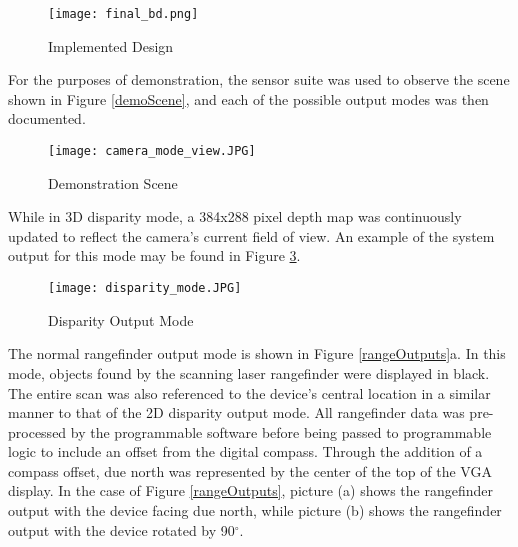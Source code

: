 \begin{figure}[H] 
	\centerline{
	\texttt{[image: final\_bd.png]}
	}
	\caption{Implemented Design}
	\label{finalBD}
\end{figure}
\par
For the purposes of demonstration, the sensor suite was used to observe the scene shown in Figure \ref{demoScene}, and each of the possible output modes was then documented.
\par
\begin{figure}[H]  
 	\centerline{
	\texttt{[image: camera\_mode\_view.JPG]}
	}
	\caption{Demonstration Scene}
	\label{camOutMode}
\end{figure}  
\par
While in 3D disparity mode, a 384x288 pixel depth map was continuously updated to reflect the camera's current field of view. An example of the system output for this mode may be found in Figure \ref{disparityOutputs}. 
\begin{figure}[H] 
              \centerline{\texttt{[image: disparity\_mode.JPG]}}
\caption{Disparity Output Mode}
\label{disparityOutputs}
\end{figure}

The normal rangefinder output mode is shown in Figure \ref{rangeOutputs}a. In this mode, objects found by the scanning laser rangefinder were displayed in black. The entire scan was also referenced to the device's central location in a similar manner to that of the 2D disparity output mode. All rangefinder data was pre-processed by the programmable software before being passed to programmable logic to include an offset from the digital compass.  Through the addition of a compass offset, due north was represented by the center of the top of the VGA display. In the case of Figure \ref{rangeOutputs}, picture (a) shows the rangefinder output with the device facing due north, while picture (b) shows the rangefinder output with the device rotated by 90$^\circ$.
\par 

